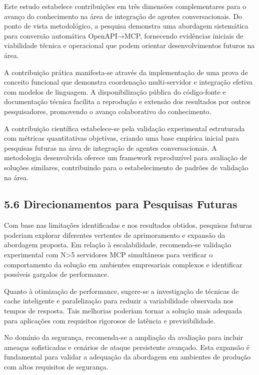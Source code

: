\documentclass[
]{article}
\begin{document}
Este estudo estabelece contribuições em três dimensões complementares
para o avanço do conhecimento na área de integração de agentes
conversacionais. Do ponto de vista metodológico, a pesquisa demonstra
uma abordagem sistemática para conversão automática OpenAPI→MCP,
fornecendo evidências iniciais de viabilidade técnica e operacional que
podem orientar desenvolvimentos futuros na área.

A contribuição prática manifesta-se através da implementação de uma
prova de conceito funcional que demonstra coordenação multi-servidor e
integração efetiva com modelos de linguagem. A disponibilização pública
do código-fonte e documentação técnica facilita a reprodução e extensão
dos resultados por outros pesquisadores, promovendo o avanço
colaborativo do conhecimento.

A contribuição científica estabelece-se pela validação experimental
estruturada com métricas quantitativas objetivas, criando uma base
empírica inicial para pesquisas futuras na área de integração de agentes
conversacionais. A metodologia desenvolvida oferece um framework
reproduzível para avaliação de soluções similares, contribuindo para o
estabelecimento de padrões de validação na área.

\subsection{5.6 Direcionamentos para Pesquisas
Futuras}\label{direcionamentos-para-pesquisas-futuras}

Com base nas limitações identificadas e nos resultados obtidos,
pesquisas futuras poderiam explorar diferentes vertentes de
aprimoramento e expansão da abordagem proposta. Em relação à
escalabilidade, recomenda-se validação experimental com N\textgreater5
servidores MCP simultâneos para verificar o comportamento da solução em
ambientes empresariais complexos e identificar possíveis gargalos de
performance.

Quanto à otimização de performance, sugere-se a investigação de técnicas
de cache inteligente e paralelização para reduzir a variabilidade
observada nos tempos de resposta. Tais melhorias poderiam tornar a
solução mais adequada para aplicações com requisitos rigorosos de
latência e previsibilidade.

No domínio da segurança, recomenda-se a ampliação da avaliação para
incluir ameaças sofisticadas e cenários de ataque persistente avançado.
Esta expansão é fundamental para validar a adequação da abordagem em
ambientes de produção com altos requisitos de segurança.
\end{document}
